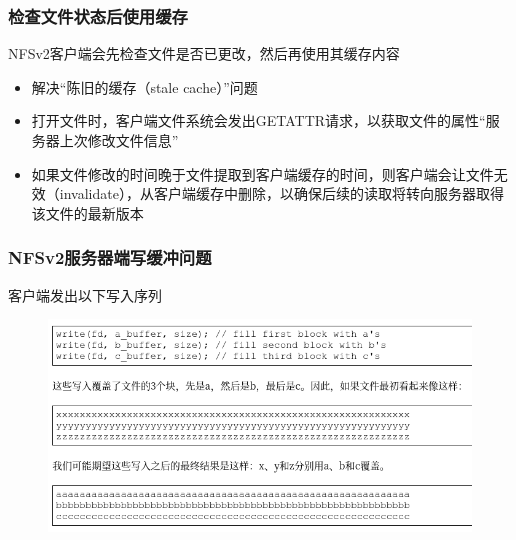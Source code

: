 \begin{frame}[fragile]
    \frametitle{检查文件状态后使用缓存}
    NFSv2客户端会先检查文件是否已更改，然后再使用其缓存内容
    \begin{itemize}
        \item 解决“陈旧的缓存（stale cache）”问题 \pause
        \item 打开文件时，客户端文件系统会发出GETATTR请求，以获取文件的属性“服务器上次修改文件信息”
        \item 如果文件修改的时间晚于文件提取到客户端缓存的时间，则客户端会让文件无效（invalidate），从客户端缓存中删除，以确保后续的读取将转向服务器取得该文件的最新版本
    \end{itemize}
    
    
\end{frame}


\begin{frame}[fragile]
    \frametitle{NFSv2服务器端写缓冲问题}
    客户端发出以下写入序列
    
        \begin{figure}
            \includegraphics[width=.8\linewidth]{figs/nfsv2-srv1.png}
        \end{figure}
    
\end{frame}

